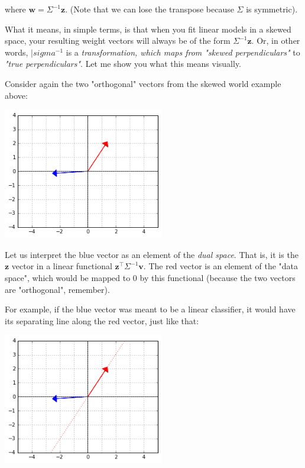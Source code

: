 \documentclass{article}
\begin{document}
where $\bm{w}=\Sigma^{-1}\bm{z}$. (Note that we can lose the transpose because $\Sigma$ is symmetric).

What it means, in simple terms, is that when you fit linear models in a skewed space, your resulting weight vectors will always be of the form $\Sigma^{-1}\bm{z}$. Or, in other words, $|sigma^{-1}$ is a \textit{transformation, which maps from "skewed perpendiculars"} to \textit{"true perpendiculars"}. Let me show you what this means visually.\medskip

Consider again the two "orthogonal" vectors from the skewed world example above:

\begin{center}
  \includegraphics[width=7cm]{figs_hints_6.png}
\end{center}

Let us interpret the blue vector as an element of the \textit{dual space}. That is, it is the $\bm{z}$ vector in a linear functional $\bm{z}^{\intercal}\Sigma^{-1}\bm{v}$. The red vector is an element of the "data space", which would be mapped to 0 by this functional (because the two vectors are "orthogonal", remember).\medskip

For example, if the blue vector was meant to be a linear classifier, it would have its separating line along the red vector, just like that:

\begin{center}
  \includegraphics[width=7cm]{figs_hints_7.png}
\end{center}
\end{document}
